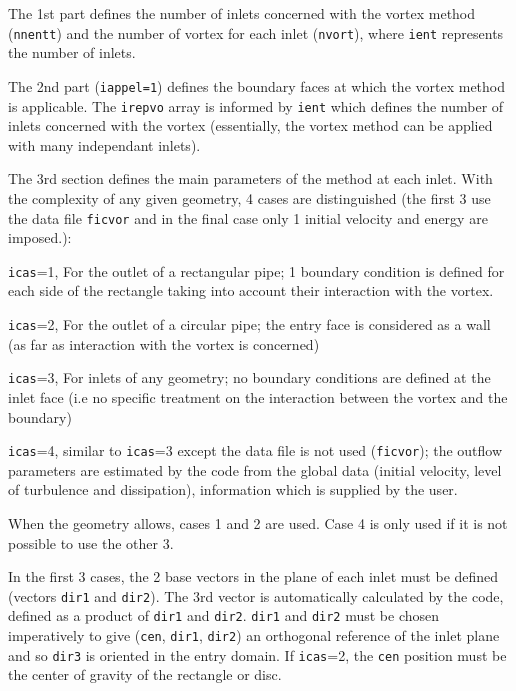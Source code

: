 {{{\begin{list}{-}{}
\item The 1st part defines the number of inlets concerned with the vortex
method (\texttt{nnentt}) and the number of vortex for each inlet
(\texttt{nvort}), where \texttt{ient} represents the number of inlets.
\item The 2nd part (\texttt{iappel=1}) defines the boundary faces at which the
      vortex method is applicable. The \texttt{irepvo} array is informed
      by \texttt{ient} which defines the number of inlets concerned with the vortex
(essentially, the vortex method can be applied with many independant inlets).
\item The 3rd section defines the main parameters of the method at each inlet.
      With the complexity of any given geometry, 4 cases are distinguished
      (the first 3 use the data file \texttt{ficvor} and in the final case only 1
      initial velocity and energy are imposed.):

\begin{list}{*}{}
\item \texttt{icas}=1, For the outlet of a rectangular pipe; 1 boundary condition is defined
for each side of the rectangle taking into account their interaction
with the vortex.
\item \texttt{icas}=2, For the outlet of a circular pipe; the entry face is considered as a
 wall (as far as interaction with the vortex is concerned)
\item \texttt{icas}=3, For inlets of any geometry; no boundary conditions are defined at the
 inlet face (i.e no specific treatment on the interaction between the
 vortex and the boundary)
\item \texttt{icas}=4, similar to \texttt{icas}=3 except the data file is not
 used (\texttt{ficvor}); the outflow
 parameters are estimated by the code from the global data (initial
 velocity, level of turbulence and dissipation), information which is
 supplied by the user.
\end{list}

When the geometry allows, cases 1 and 2 are used. Case 4 is only used
 if it is not possible to use the other 3.

In the first 3 cases, the 2 base vectors in the plane of each inlet
must be defined (vectors \texttt{dir1} and \texttt{dir2}). The 3rd vector is
automatically calculated by the code, defined as a product of \texttt{dir1} and
\texttt{dir2}. \texttt{dir1} and \texttt{dir2} must be chosen imperatively to
give (\texttt{cen}, \texttt{dir1}, \texttt{dir2}) an orthogonal reference of the
inlet plane and so \texttt{dir3} is oriented in the entry domain. If
\texttt{icas}=2, the \texttt{cen} position must be the center of gravity of the
rectangle or disc.


\end{list}}}}
